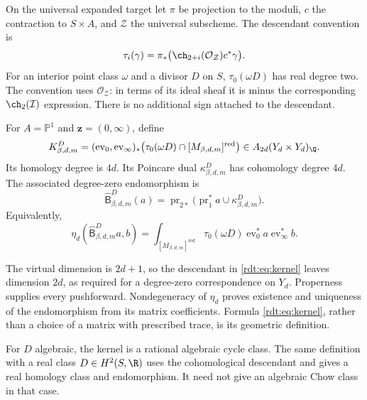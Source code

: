 On the universal expanded target let $\pi$ be projection to the moduli,
$c$ the contraction to $S\times A$, and $\mathcal Z$ the universal
subscheme. The descendant convention is
\begin{equation}\label{rdt:eq:desc}
 \tau_i(\gamma)=\pi_*\bigl(\ch_{2+i}(\mathcal O_{\mathcal Z})c^*\gamma\bigr).
\end{equation}
For an interior point class $\omega$ and a divisor $D$ on $S$,
$\tau_0(\omega D)$ has real degree two. The convention uses
$\mathcal O_{\mathcal Z}$: in terms of its ideal sheaf it is minus
the corresponding $\ch_2(\mathcal I)$ expression. There is no additional
sign attached to the descendant.

\begin{definition}\label{rdt:def:kernel}
For $A=\mathbb P^1$ and $\mathbf z=(0,\infty)$, define
\begin{equation}\label{rdt:eq:kernel}
 K^D_{\beta,d,m}=(\operatorname{ev}_0,\operatorname{ev}_\infty)_*
 \bigl(\tau_0(\omega D)\cap[M_{\beta,d,m}]^\mathrm{red}\bigr)
 \in A_{2d}(Y_d\times Y_d)_\Q.
\end{equation}
Its homology degree is $4d$. Its Poincare dual $\kappa^D_{\beta,d,m}$
has cohomology degree $4d$. The associated degree-zero endomorphism is
\begin{equation}\label{rdt:eq:B}
 \widehat{\mathsf B}^D_{\beta,d,m}(a)
 =\operatorname{pr}_{2*}
   \bigl(\operatorname{pr}_1^*a\cup\kappa^D_{\beta,d,m}\bigr).
\end{equation}
Equivalently,
\begin{equation}\label{rdt:eq:matrix}
 \eta_d(\widehat{\mathsf B}^D_{\beta,d,m}a,b)
 =\int_{[M_{\beta,d,m}]^\mathrm{red}}
    \tau_0(\omega D)\operatorname{ev}_0^*a\operatorname{ev}_\infty^*b.
\end{equation}
\end{definition}

The virtual dimension is $2d+1$, so the descendant in
\eqref{rdt:eq:kernel} leaves dimension $2d$, as required for a
degree-zero correspondence on $Y_d$. Properness supplies every
pushforward. Nondegeneracy of $\eta_d$ proves existence and uniqueness
of the endomorphism from its matrix coefficients. Formula
\eqref{rdt:eq:kernel}, rather than a choice of a matrix with prescribed
trace, is its geometric definition.

For $D$ algebraic, the kernel is a rational algebraic cycle class.
The same definition with a real class $D\in H^2(S,\R)$ uses the
cohomological descendant and gives a real homology class and
endomorphism. It need not give an algebraic Chow class in that case.


